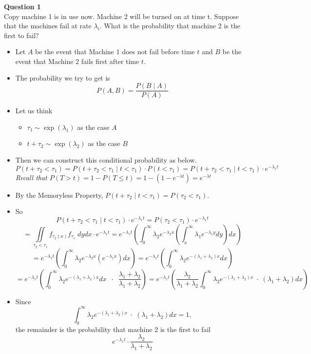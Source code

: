 \documentclass[12pt]{article}
\begin{document}


\noindent
\textbf{Question 1}\\
Copy machine 1 is in use now. Machine 2 will be turned on at time t.
Suppose that the machines fail at rate $\lambda_i$. What is the probability that machine 2 is the first to fail?

\begin{itemize}
    \item Let $A$ be the event that Machine 1 does not fail before time $t$ and $B$ be the event that Machine 2 fails first after time $t$.
    \item The probability we try to get is 
    $$P(A,B) = \frac{P(B\;|\;A)}{P(A)}$$
    \item Let us think 
    \begin{itemize}
        \item $\tau_1 \sim \exp(\lambda_1)$ as the case $A$
        \item $t+\tau_2 \sim \exp(\lambda_2)$ as the case $B$
    \end{itemize}
    
    \item Then we can construct this conditional probability as below.
    $$P(t+\tau_2 < \tau_1) = P(t+\tau_2<\tau_1\;|\; t<\tau_1)\cdot P(t<\tau_1)
    =P(t+\tau_2<\tau_1\;|\; t<\tau_1)\cdot e^{-\lambda_1 t}$$
    {\sl Recall that $P(T>t) = 1-P(T\le t)=1-\left(1-e^{-\lambda t}\right) = e^{-\lambda t}$}
    
    \item By the Memoryless Property, $P(t+\tau_2\;|\; t<\tau_1) = P(\tau_2<\tau_1)$.
    \item So 
    $$P(t+\tau_2<\tau_1\;|\; t<\tau_1)\cdot e^{-\lambda_1 t} =  P(\tau_2<\tau_1) \cdot e^{-\lambda_1 t}$$
    $$=\iint\limits_{\tau_2<\tau_1} f_{\tau_2(x)}f_{\tau_1}\;dydx\cdot e^{-\lambda_1 t}
    =e^{-\lambda_1 t}\left(\int_0^\infty \lambda_2 e^{-\lambda_2 x}\left(\int_x^\infty \lambda_1 e^{-\lambda_1 y}dy\right)dx\right)$$
    $$=e^{-\lambda_1 t}\left(\int_0^\infty \lambda_2 e^{-\lambda_2 x}\left(
    e^{-\lambda_1 x}
    \right)dx\right)
    =e^{-\lambda_1 t}\left(\int_0^\infty \lambda_2 e^{-(\lambda_1+\lambda_2) x}
    dx\right)$$
    $$=e^{-\lambda_1 t}\left(\int_0^\infty \lambda_2 e^{-(\lambda_1+\lambda_2) x}
    dx\;\;\cdot\;\; \frac{\lambda_1+\lambda_2}{\lambda_1+\lambda_2}\right)
    =e^{-\lambda_1 t}\left(\frac{\lambda_2}{\lambda_1+\lambda_2} \int_0^\infty \lambda_2 e^{-(\lambda_1+\lambda_2) x} \;\cdot\;(\lambda_1+\lambda_2)
    dx \right)    $$
    
    \item Since $$\int_0^\infty \lambda_2 e^{-(\lambda_1+\lambda_2) x} \;\cdot\;(\lambda_1+\lambda_2)
    dx = 1,$$
    the remainder is the probability that machine 2 is the first to fail
    $$e^{-\lambda_1 t}\cdot\frac{\lambda_2}{\lambda_1+\lambda_2}$$
\end{itemize}
\end{document}
